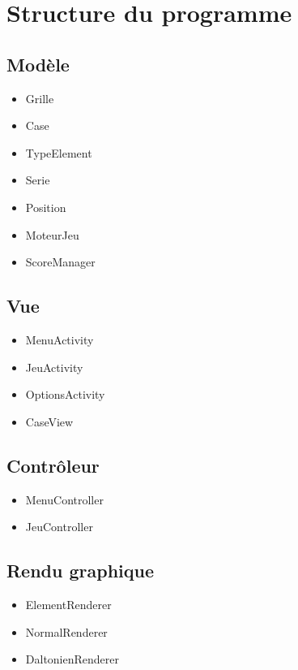 \documentclass[a4paper,12pt]{article}
\begin{document}
\section{Structure du programme}

\subsection{Modèle}

\begin{itemize}
    \item Grille
    \item Case
    \item TypeElement
    \item Serie
    \item Position
    \item MoteurJeu
    \item ScoreManager
\end{itemize}

\subsection{Vue}

\begin{itemize}
    \item MenuActivity
    \item JeuActivity
    \item OptionsActivity
    \item CaseView
\end{itemize}

\subsection{Contrôleur}

\begin{itemize}
    \item MenuController
    \item JeuController
\end{itemize}

\subsection{Rendu graphique}

\begin{itemize}
    \item ElementRenderer
    \item NormalRenderer
    \item DaltonienRenderer
\end{itemize}
\end{document}
